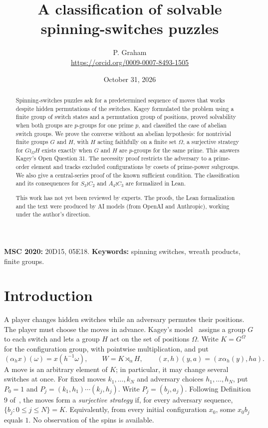 \documentclass[11pt]{article}
\title{A classification of solvable spinning-switches puzzles}
\author{P. Graham\\ \small\url{https://orcid.org/0009-0007-8493-1505}}
\date{October 31, 2026}
\newcommand{\K}{G^{\Omega}}
\newcommand{\al}{\alpha}
\begin{document}
\maketitle
\begin{abstract}
Spinning-switches puzzles ask for a predetermined sequence of moves that
works despite hidden permutations of the switches. Kagey formulated the
problem using a finite group of switch states and a permutation group of
positions, proved solvability when both groups are $p$-groups for one
prime $p$, and classified the case of abelian switch groups. We prove the
converse without an abelian hypothesis: for nontrivial finite groups $G$
and $H$, with $H$ acting faithfully on a finite set $\Omega$, a surjective
strategy for $G\wr_\Omega H$ exists exactly when $G$ and $H$ are $p$-groups
for the same prime. This answers Kagey's Open Question 31. The necessity
proof restricts the adversary to a prime-order element and tracks excluded
configurations by cosets of prime-power subgroups. We also give a central-series
proof of the known sufficient condition. The classification and its
consequences for $S_3\wr C_2$ and $A_4\wr C_3$ are formalized in Lean.

This work has not yet been reviewed by experts.
The proofs, the Lean formalization and the text were produced by AI models (from OpenAI and Anthropic), working under the author's direction.
\end{abstract}
\medskip
\noindent\textbf{MSC 2020:} 20D15, 05E18.\quad
\textbf{Keywords:} spinning switches, wreath products, finite groups.

\section{Introduction}
A player changes hidden switches while an adversary permutes their positions.
The player must choose the moves in advance. Kagey's model~\cite{Kagey}
assigns a group $G$ to each switch and lets a group $H$ act on the set of
positions $\Omega$. Write $K=\K$ for the configuration group, with
pointwise multiplication, and put
\[
  (\al_hx)(\omega)=x(h^{-1}\omega),\qquad
  W=K\rtimes_\al H,\qquad
  (x,h)(y,a)=(x\al_h(y),ha).
\]
A move is an arbitrary element of $K$; in particular, it may change several
switches at once. For fixed moves $k_1,\ldots,k_N$ and adversary choices
$h_1,\ldots,h_N$, put $P_0=1$ and
$P_j=(k_1,h_1)\cdots(k_j,h_j)$. Write $P_j=(b_j,a_j)$.
Following Definition 9 of~\cite[arXiv v1]{Kagey}, the moves form a
\emph{surjective strategy} if, for every adversary sequence,
$\{b_j:0\leq j\leq N\}=K$. Equivalently, from every initial configuration
$x_0$, some $x_0b_j$ equals $1$. No observation of the spins is available.
\end{document}
